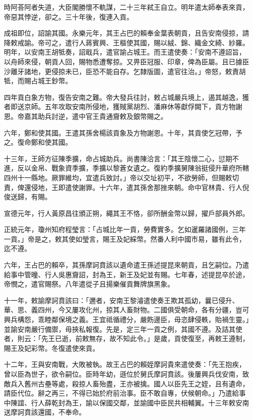 \begin{pinyinscope}
時阿荅阿者失道，大臣閣勝懷不軌謀，二十三年弒王自立。明年遣太師奉表來貢，帝惡其悖逆，卻之。三十年後，復連入貢。

成祖即位，詔諭其國。永樂元年，其王占巴的賴奉金葉表朝貢，且告安南侵掠，請降敕戒諭。帝可之，遣行人蔣賓興、王樞使其國，賜以絨、錦、織金文綺、紗羅。明年，以安南王胡牴奏，詔戢兵，遣官諭占城王。而王遣使奏：「安南不遵詔旨，以舟師來侵，朝貢人回，賜物悉遭奪掠。又畀臣冠服、印章，俾為臣屬。且已據臣沙離牙諸地，更侵掠未已，臣恐不能自存。乞隸版圖，遣官往治。」帝怒，敕責胡牴，而賜占城王鈔幣。

四年貢白象方物，復告安南之難。帝大發兵往討，敕占城嚴兵境上，遏其越逸，獲者即送京師。五年攻取安南所侵地，獲賊黨胡烈、潘麻休等獻俘闕下，貢方物謝恩。帝嘉其助兵討逆，遣中官王貴通齎敕及銀幣賜之。

六年，鄭和使其國。王遣其孫舍楊該貢象及方物謝恩。十年，其貢使乞冠帶，予之。復命鄭和使其國。

十三年，王師方征陳季擴，命占城助兵。尚書陳洽言：「其王陰懷二心，愆期不進，反以金帛、戰象資季擴，季擴以黎蒼女遺之。復約季擴舅陳翁挺侵升華府所轄四州十一縣地。厥罪維均，宜遣兵致討。」帝以交址初平，不欲勞師，但賜敕切責，俾還侵地，王即遣使謝罪。十六年，遣其孫舍那挫來朝。命中官林貴、行人倪俊送歸，有賜。

宣德元年，行人黃原昌往頒正朔，繩其王不恪，卻所酬金幣以歸，擢戶部員外郎。

正統元年，瓊州知府程瑩言：「占城比年一貢，勞費實多。乞如暹羅諸國例，三年一貢。」帝是之，敕其使如瑩言，賜王及妃綵幣。然番人利中國市易，雖有此令，迄不遵。

六年，王占巴的賴卒，其孫摩訶賁該以遺命遣王孫述提昆來朝貢，且乞嗣位。乃遣給事中管曈、行人吳惠齎詔，封為王，新王及妃並有賜。七年春，述提昆卒於途，帝憫之，遣官賜祭。八年遣從子且揚樂催貢舞牌旗黑象。

十一年，敕諭摩訶賁該曰：「邇者，安南王黎濬遣使奏王欺其孤幼，曩已侵升、華、思、義四州，今又屢攻化州，掠其人畜財物。二國俱受朝命，各有分疆，豈可興兵構怨，乖睦鄰保境之義。王宜祗循禮分，嚴飭邊臣，毋恣肆侵軼，貽禍生靈。」並諭安南嚴行備禦，毋挾私報復。先是，定三年一貢之例，其國不遵。及詰其使者，則云：「先王已逝，前敕無存，故不知此令。」是歲，貢使復至，再敕王遵制，賜王及妃彩幣。冬復遣使來貢。

十二年，王與安南戰，大敗被執。故王占巴的賴姪摩訶貴來遣使奏：「先王抱疾，曾以臣為世子，欲令嗣位。臣時年幼，遜位於舅氏摩訶賁該。後屢興兵伐安南，致敵兵入舊州古壘等處，殺掠人畜殆盡，王亦被擒。國人以臣先王之姪，且有遺命，請臣代位。辭之再三，不得已始於府前治事。臣不敢自專，伏候朝命。」乃遣給事中陳誼、行人薛乾封為王，諭以保國交鄰，並諭國中臣民共相輔翼。十三年敕安南送摩訶賁該還國，不奉命。


\end{pinyinscope}
